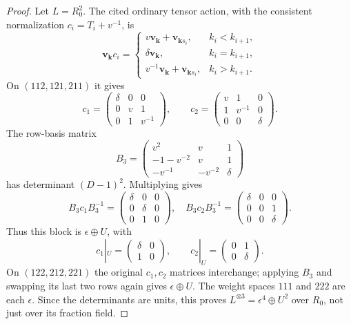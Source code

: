 \documentclass[11pt,a4paper]{article}
\theoremstyle{named}\newtheorem{finding}{Finding}[section]
\theoremstyle{definition}\newtheorem{definition}[finding]{Definition}
\theoremstyle{remark}\newtheorem{remark}[finding]{Remark}
\begin{document}
\begin{proof}
Let $L=R_0^2$. The cited ordinary tensor action, with the consistent
normalization $c_i=T_i+v^{-1}$, is
\[
 \mathbf v_{\mathbf k}c_i=
 \begin{cases}
 v\mathbf v_{\mathbf k}+\mathbf v_{\mathbf k s_i},&k_i<k_{i+1},\\
 \delta\mathbf v_{\mathbf k},&k_i=k_{i+1},\\
 v^{-1}\mathbf v_{\mathbf k}+\mathbf v_{\mathbf k s_i},&k_i>k_{i+1}.
 \end{cases}
\]
On $(112,121,211)$ it gives
\[
 c_1=\begin{pmatrix}\delta&0&0\\0&v&1\\0&1&v^{-1}\end{pmatrix},\qquad
 c_2=\begin{pmatrix}v&1&0\\1&v^{-1}&0\\0&0&\delta\end{pmatrix}.
\]
The row-basis matrix
\[
 B_3=\begin{pmatrix}v^2&v&1\\-1-v^{-2}&v&1\\
                         -v^{-1}&-v^{-2}&\delta\end{pmatrix}
\]
has determinant $(D-1)^2$. Multiplying gives
\[
 B_3c_1B_3^{-1}=\begin{pmatrix}\delta&0&0\\0&\delta&0\\0&1&0\end{pmatrix},
 \quad
 B_3c_2B_3^{-1}=\begin{pmatrix}\delta&0&0\\0&0&1\\0&0&\delta\end{pmatrix}.
\]
Thus this block is $\epsilon\oplus U$, with
\[
 c_1|_U=\begin{pmatrix}\delta&0\\1&0\end{pmatrix},\qquad
 c_2|_U=\begin{pmatrix}0&1\\0&\delta\end{pmatrix}.
\]
On $(122,212,221)$ the original $c_1,c_2$ matrices interchange; applying
$B_3$ and swapping its last two rows again gives $\epsilon\oplus U$.
The weight spaces $111$ and $222$ are each $\epsilon$. Since the determinants
are units, this proves $L^{\otimes3}=\epsilon^4\oplus U^2$ over $R_0$,
not just over its fraction field.


\end{proof}
\end{document}
